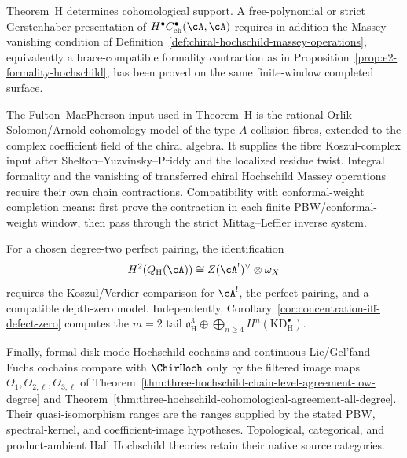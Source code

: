 \begin{proposition}
\label{prop:theorem-h-massey-formality-firewall}
Theorem~H determines cohomological support.  A free-polynomial or
strict Gerstenhaber presentation of
$H^\bullet C^\bullet_{\mathrm{ch}}(\cA,\cA)$ requires in addition the
Massey-vanishing condition of
Definition~\ref{def:chiral-hochschild-massey-operations}, equivalently
a brace-compatible formality contraction as in
Proposition~\ref{prop:e2-formality-hochschild}, has been proved on
the same finite-window completed surface.

The Fulton--MacPherson input used in Theorem~H is the rational
Orlik--Solomon/Arnold cohomology model of the type-\(A\) collision
fibres, extended to the complex coefficient field of the chiral
algebra. It supplies the fibre Koszul-complex input after
Shelton--Yuzvinsky--Priddy and the localized residue twist.  Integral
formality and the vanishing of transferred chiral Hochschild Massey
operations require their own chain contractions. Compatibility with
conformal-weight completion means: first prove the contraction in
each finite PBW/conformal-weight window, then pass through the strict
Mittag--Leffler inverse system.

For a chosen degree-two perfect pairing, the identification
\[
 H^2(Q_{\mathrm H}(\cA))
 \cong
 Z(\cA^!)^\vee\otimes\omega_X
\]
requires the Koszul/Verdier comparison for \(\cA^!\), the perfect
pairing, and a compatible depth-zero model.  Independently,
Corollary~\ref{cor:concentration-iff-defect-zero} computes the
$m=2$ tail
\(\mathfrak{o}_{\mathrm H}^{3}\oplus
 \bigoplus_{n\geq4}H^n(\mathrm{KD}_{\mathrm H}^\bullet)\).

Finally, formal-disk mode Hochschild cochains and continuous
Lie/Gel'fand--Fuchs cochains compare with \(\ChirHoch\) only by the
filtered image maps
\(\Theta_1,\Theta_{2,\ell},\Theta_{3,\ell}\) of
Theorem~\ref{thm:three-hochschild-chain-level-agreement-low-degree}
and Theorem~\ref{thm:three-hochschild-cohomological-agreement-all-degree}.
Their quasi-isomorphism ranges are the ranges supplied by the stated
PBW, spectral-kernel, and coefficient-image hypotheses. Topological,
categorical, and product-ambient Hall Hochschild theories retain their
native source categories.
\end{proposition}

